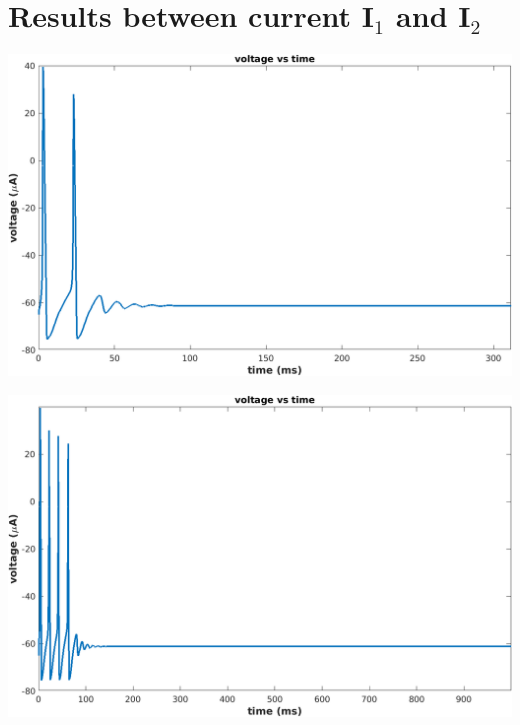 \documentclass[12pt, a4paper]{article}
\begin{document}
\section{Results between current I$_1$ and I$_2$}
\label {I1-I2 results}


\begin{center}
\begin{minipage}{0.45\linewidth}
    \includegraphics[width=\textwidth]{Q1_3}
    \label{fig:Q1_3}
\end{minipage}
\hfill
\begin{minipage}{0.45\linewidth}
    \includegraphics[width=\textwidth]{Q1_4}
    \label{fig:Q1_4}
\end{minipage}
\end{center}

\vspace{1em}
\end{document}
